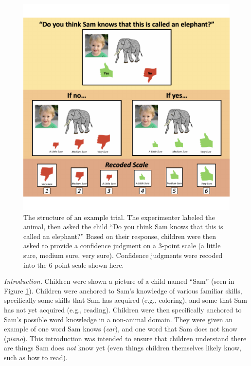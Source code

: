 \documentclass[10pt, letterpaper]{article}
\newenvironment{CodeChunk}{}{}
\begin{document}
\begin{CodeChunk}
\begin{figure}[tb]

{\centering \includegraphics{figs/task-method-1} 

}

\caption[The structure of an example trial]{The structure of an example trial. The experimenter labeled the animal, then asked the child “Do you think Sam knows that this is called an elephant?” Based on their response, children were then asked to provide a confidence judgment on a 3-point scale (a little sure, medium sure, very sure). Confidence judgments were recoded into the 6-point scale shown here.}\label{fig:task-method}
\end{figure}
\end{CodeChunk}

\emph{Introduction.} Children were shown a picture of a child named
``Sam'' (seen in Figure \ref{fig:task-method}). Children were anchored
to Sam's knowledge of various familiar skills, specifically some skills
that Sam has acquired (e.g., coloring), and some that Sam has not yet
acquired (e.g., reading). Children were then specifically anchored to
Sam's possible word knowledge in a non-animal domain. They were given an
example of one word Sam knows (\emph{car}), and one word that Sam does
not know (\emph{piano}). This introduction was intended to ensure that
children understand there are things Sam does \emph{not} know yet (even
things children themselves likely know, such as how to read).
\end{document}
